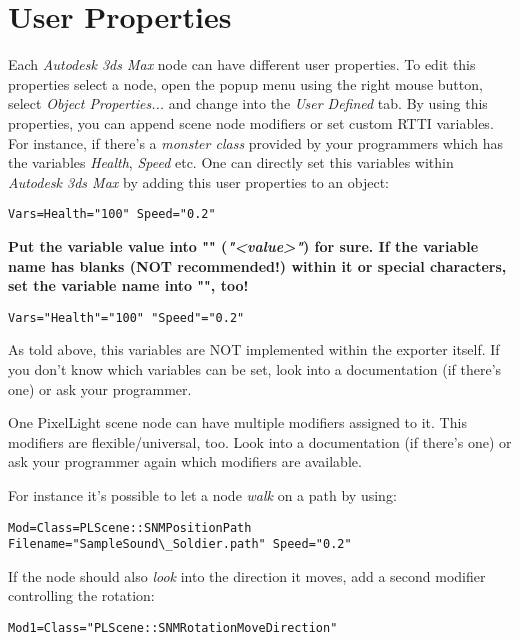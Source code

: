 \chapter{User Properties}
Each \emph{Autodesk 3ds Max} node can have different user properties. To edit this properties select a node, open the popup menu using the right mouse button, select \emph{Object Properties...} and change into the \emph{User Defined} tab. By using this properties, you can append scene node modifiers or set custom RTTI variables. For instance, if there's a \emph{monster class} provided by your programmers which has the variables \emph{Health}, \emph{Speed} etc. One can directly set this variables within \emph{Autodesk 3ds Max} by adding this user properties to an object:

\begin{lstlisting}[caption=Setting scene node variables]
Vars=Health="100" Speed="0.2"
\end{lstlisting}

\textbf{Put the variable value into "" (\emph{"<value>"}) for sure. If the variable name has blanks (NOT recommended!) within it or special characters, set the variable name into "", too!}

\begin{lstlisting}[caption=Setting scene node variables safely]
Vars="Health"="100" "Speed"="0.2"
\end{lstlisting}

As told above, this variables are NOT implemented within the exporter itself. If you don't know which variables can be set, look into a documentation (if there's one) or ask your programmer.

One PixelLight scene node can have multiple modifiers assigned to it. This modifiers are flexible/universal, too. Look into a documentation (if there's one) or ask your programmer again which modifiers are available.

For instance it's possible to let a node \emph{walk} on a path by using:

\begin{lstlisting}[caption=Path scene node modifier]
Mod=Class=PLScene::SNMPositionPath Filename="SampleSound\_Soldier.path" Speed="0.2"
\end{lstlisting}

If the node should also \emph{look} into the direction it moves, add a second modifier controlling the rotation:

\begin{lstlisting}[caption=Look into movement direction scene node modifier]
Mod1=Class="PLScene::SNMRotationMoveDirection"
\end{lstlisting}

